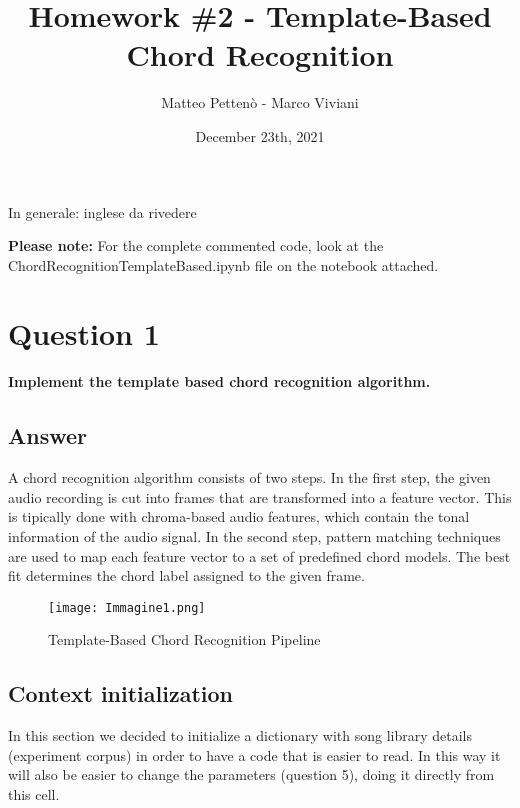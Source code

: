 \documentclass{article}
\title{Homework \#2 - Template-Based Chord Recognition} %
\author{Matteo Pettenò - Marco Viviani} %
\date{December 23th, 2021} %
\institute{Politecnico di Milano} %
\begin{document}
\maketitle %


\color{red}

In generale: inglese da rivedere\\ 
\color{black}

\textbf{Please note:} For the complete commented code, look at the ChordRecognitionTemplateBased.ipynb file on the notebook attached.

\section*{\color{red}Question 1}

\begin{problem}
	\textbf{Implement the template based chord recognition algorithm.}
\end{problem}

\subsection*{\color{blue}Answer}

A chord recognition algorithm consists of two steps. In the first step, the given audio recording is cut into frames that are transformed into a feature vector. This is tipically done with chroma-based audio features, which contain the tonal information of the audio signal.
In the second step, pattern matching techniques are used to map each feature vector to a set of predefined chord models. The best fit determines the chord label assigned to the given frame.

\begin{figure}[H]
 \centering
 \texttt{[image: Immagine1.png]}
 \caption{Template-Based Chord Recognition Pipeline}
\end{figure}

\subsection*{Context initialization}
In this section we decided to initialize a dictionary with song library details (experiment corpus) in order to have a code that is easier to read. In this way it will also be easier to change the parameters (question 5), doing it directly from this cell.
\end{document}
